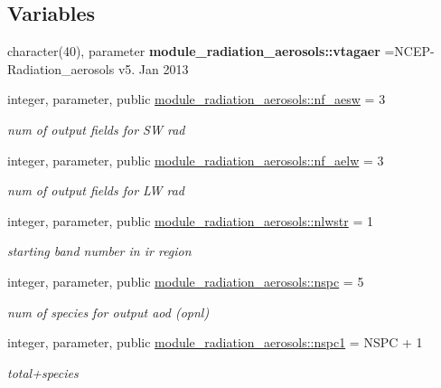 \subsection*{Variables}
\begin{DoxyCompactItemize}
\item 
\mbox{\label{radiation__aerosols_8f_a6d0e0cbcb4a13c1f80f6b1c41b13d3b8}} 
character(40), parameter {\bfseries module\+\_\+radiation\+\_\+aerosols\+::vtagaer} =\textquotesingle{}N\+C\+EP-\/Radiation\+\_\+aerosols v5. Jan 2013 \textquotesingle{}
\item 
integer, parameter, public \hyperlink{group__module__radiation__aerosols_gae0d9615fa694e2a5dfe8fb48e99b7e76}{module\+\_\+radiation\+\_\+aerosols\+::nf\+\_\+aesw} = 3
\begin{DoxyCompactList}\small\item\em num of output fields for SW rad \end{DoxyCompactList}\item 
integer, parameter, public \hyperlink{group__module__radiation__aerosols_gafba0069cd611248a9595a126a13f5203}{module\+\_\+radiation\+\_\+aerosols\+::nf\+\_\+aelw} = 3
\begin{DoxyCompactList}\small\item\em num of output fields for LW rad \end{DoxyCompactList}\item 
integer, parameter, public \hyperlink{group__module__radiation__aerosols_ga654ab60d433133542d3c07edd2244566}{module\+\_\+radiation\+\_\+aerosols\+::nlwstr} = 1
\begin{DoxyCompactList}\small\item\em starting band number in ir region \end{DoxyCompactList}\item 
integer, parameter, public \hyperlink{group__module__radiation__aerosols_ga3d126c465af80bb698d9d1a288c181bb}{module\+\_\+radiation\+\_\+aerosols\+::nspc} = 5
\begin{DoxyCompactList}\small\item\em num of species for output aod (opnl) \end{DoxyCompactList}\item 
integer, parameter, public \hyperlink{group__module__radiation__aerosols_ga476c0181513603112dec3f4d2a2ec839}{module\+\_\+radiation\+\_\+aerosols\+::nspc1} = N\+S\+PC + 1
\begin{DoxyCompactList}\small\item\em total+species \end{DoxyCompactList}\item 

\end{DoxyCompactItemize}
